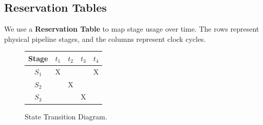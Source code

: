 \documentclass[12pt,a4paper,openany]{book}
\begin{document}
\subsection{Reservation Tables}
We use a \textbf{Reservation Table} to map stage usage over time. The rows represent physical pipeline stages, and the columns represent clock cycles.

\begin{figure}[htbp]
    \centering
    \begin{minipage}{0.45\textwidth}
        \centering
        \begin{tabular}{ccccc}
            \toprule
            Stage & $t_1$ & $t_2$ & $t_3$ & $t_4$ \\
            \midrule
            $S_1$ & X     &       &       & X     \\
            $S_2$ &       & X     &       &       \\
            $S_3$ &       &       & X     &       \\
            \bottomrule
        \end{tabular}
        \caption{Sample non-linear pipeline Reservation Table.}
        \label{tab:reservation}
    \end{minipage}\hfill
    \begin{minipage}{0.48\textwidth}
        \centering
        \caption{State Transition Diagram.}
        \label{fig:state_diagram}
    \end{minipage}
\end{figure}
\end{document}
